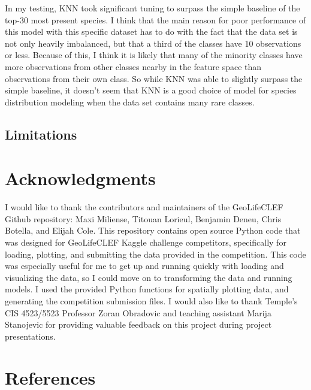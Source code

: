\documentclass[12pt, oneside]{article}
\begin{document}
\begin{normalsize}
In my testing, KNN took significant tuning to surpass the simple baseline of the top-30 most present species. I think that the main reason for poor performance of this model with this specific dataset has to do with the fact that the data set is not only heavily imbalanced, but that a third of the classes have 10 observations or less. Because of this, I think it is likely that many of the minority classes have more observations from other classes nearby in the feature space than observations from their own class. So while KNN was able to slightly surpass the simple baseline, it doesn't seem that KNN is a good choice of model for species distribution modeling when the data set contains many rare classes.



\subsection{Limitations}

\end{normalsize}

\section{Acknowledgments}
\label{Acknowledgments}

\begin{normalsize}

I would like to thank the contributors and maintainers of the GeoLifeCLEF Github repository: Maxi Miliense, Titouan Lorieul, Benjamin Deneu, Chris Botella, and Elijah Cole. This repository contains open source Python code that was designed for GeoLifeCLEF Kaggle challenge competitors, specifically for loading, plotting, and submitting the data provided in the competition. This code was especially useful for me to get up and running quickly with loading and visualizing the data, so I could move on to transforming the data and running models. I used the provided Python functions for spatially plotting data, and generating the competition submission files. I would also like to thank Temple's CIS 4523/5523 Professor Zoran Obradovic and teaching assistant Marija Stanojevic for providing valuable feedback on this project during project presentations.

\end{normalsize}

\section{References}
\label{References}
\nocite{*}
\printbibliography[heading=none]
\end{document}
